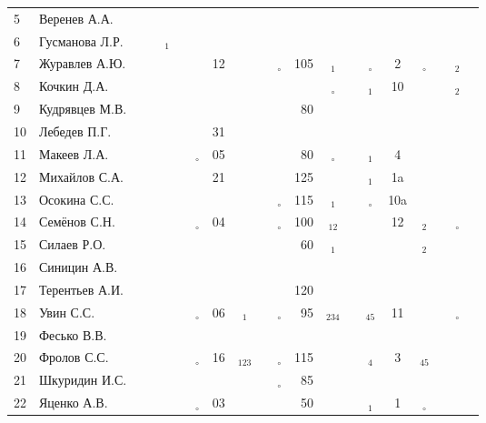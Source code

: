 \documentclass[a4paper,landscape,11pt]{article}
\newcommand*\OK{&\small \ding{51}$\!\!_\circ$} %
\newcommand*\Ok{&\small \ding{51}$\!\!_\circ$} %
\newcommand*\ok{&{\small \ding{51}}} %
\newcommand*\no{&{\small }} %
\newcommand*\da{&{\small\ding{48}$\!\!_1$}} %
\newcommand*\ab{&{\small\ding{48}$\!\!_{12}$}} %
\newcommand*\dabc{&{\small\ding{48}$\!\!_{123}$}} %
\newcommand*\db{&{\small\ding{48}$\!\!_2$}} %
\newcommand*\dd{&{\small\ding{48}$\!\!_4$}} %
\newcommand*\bd{&{\small\ding{48}$\!\!_{234}$}} %
\newcommand*\de{&{\small\ding{48}$\!\!_{45}$}} %
\begin{document}
\begin{tabular}{l|l|cccccccccrcccccccc}
 5&Веренев А.А.    \no\no\no\no\ok\no\no  \ok\ok \no\no\no\no \no\ok\no\no\no\\
 6&Гусманова Л.Р.  \ok\ok\da\ok\no\no\no  \no\no \no\no\no\no \no\no\no\no\no\\
 7&Журавлев А.Ю.   \no\no\no\no\ok&12\ok  \ok\OK&105\da\ok\Ok&  2\Ok\ok\db\ok\\
 8&Кочкин Д.А.     \no\no\no\no\ok\ok\no  \ok\no \no\Ok\no\da& 10\no\no\db\ok\\
 9&Кудрявцев М.В.  \no\no\ok\ok\no\no\no  \ok\ok& 80\ok\ok\no \no\no\no\no\no\\
10&Лебедев П.Г.    \ok\ok\no\ok\ok&31\no  \ok\no \no\no\no\no \no\no\ok\ok\ok\\
11&Макеев Л.А.     \ok\ok\ok\ok\OK&05\ok  \ok\ok& 80\Ok\ok\da&  4\ok\ok\ok\ok\\
\midrule
12&Михайлов С.А.   \no\no\ok\ok\ok&21\no  \ok\ok&125\ok\ok\da& 1a\ok\ok\ok\ok\\
13&Осокина С.С.    \ok\ok\ok\ok\no\no\ok  \ok\OK&115\da\no\Ok&10a\ok\no\ok\no\\
14&Семёнов С.Н.    \ok\ok\ok\ok\OK&04\ok  \ok\OK&100\ab\ok\ok& 12\db\no\Ok\ok\\
15&Силаев Р.О.     \ok\ok\no\no\no\no\no  \no\ok& 60\da\ok\no \no\db\no\ok\no\\
16&Синицин А.В.    \ok\ok\no\ok\no\no\no  \no\no \no\no\no\no \no\no\no\no\no\\
17&Терентьев А.И.  \ok\ok\ok\ok\no\no\no  \no\ok&120\no\no\no \no\no\no\no\no\\
18&Увин С.С.       \ok\ok\ok\ok\OK&06\da  \ok\OK& 95\bd\ok\de& 11\ok\ok\Ok\ok\\
19&Фесько В.В.     \no\no\no\no\no\no\no  \no\no \no\no\no\no \no\no\no\no\no\\
20&Фролов С.С.     \ok\ok\ok\ok\OK&16\dabc\ok\OK&115\ok\ok\dd&  3\de\ok\ok\ok\\ 
21&Шкуридин И.С.   \ok\ok\ok\ok\ok\no\ok  \ok\OK& 85\ok\ok\no \no\ok\no\no\no\\
22&Яценко А.В.     \ok\ok\ok\ok\OK&03\ok  \ok\ok& 50\ok\ok\da&  1\Ok\no\no\no\\ 
\bottomrule
\end{tabular} 
\newpage
\end{document}
